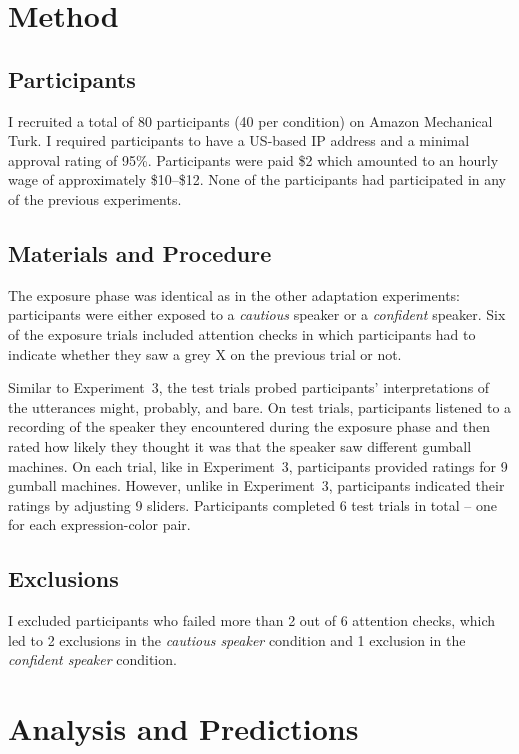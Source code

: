 \section{Method}
\subsection{Participants}

I recruited a total of 80 participants (40 per condition) on Amazon Mechanical Turk. I required participants to have a US-based IP address and a minimal approval rating of 95\%. Participants were paid \$2 which amounted to an hourly wage of approximately \$10--\$12. None of the participants had participated in any of the previous experiments. 

\subsection{Materials and Procedure}

The exposure phase was identical as in the other adaptation experiments: participants were either exposed to a 
\textit{cautious} speaker or a \textit{confident} speaker. Six of the exposure trials included attention checks in which
participants had to indicate whether they saw a grey X on the previous trial or not.

Similar to Experiment~3, the test trials probed participants'
interpretations of the utterances {\sc might}, {\sc probably}, and {\sc bare}. On test trials, participants listened
to a recording of the speaker they encountered during the exposure phase and then rated how likely they
thought it was that the speaker saw different gumball machines. On each trial, like in Experiment~3, participants
provided ratings for 9 gumball machines. However, unlike in Experiment~3, participants indicated their ratings
by adjusting 9 sliders. Participants completed 6 test trials in total -- one for each expression-color pair.

\subsection{Exclusions}

I excluded participants who failed more than 2 out of 6 attention checks, which led to 2 exclusions in the \emph{cautious speaker} condition and 1 exclusion in the \emph{confident speaker} condition.


\section{Analysis and Predictions}

